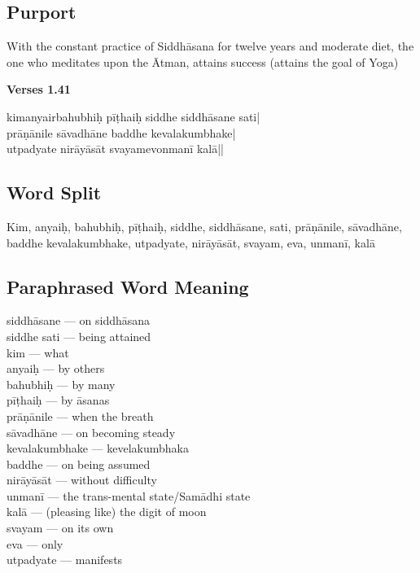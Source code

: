 \subsection*{Purport}

With the constant practice of Siddhāsana for twelve years and moderate diet, the one who meditates upon the Ātman,  attains success (attains the goal of Yoga)

\newpage
\noindent \textbf{Verses 1.41}

\begin{shloka}
kimanyairbahubhiḥ pīṭhaiḥ siddhe siddhāsane sati|\\
prāṇānile sāvadhāne baddhe kevalakumbhake|\\
utpadyate nirāyāsāt svayamevonmanī kalā||
\end{shloka}

\subsection*{Word Split}

Kim, anyaiḥ, bahubhiḥ, pīṭhaiḥ, siddhe, siddhāsane, sati, prāṇānile, sāvadhāne, baddhe kevalakumbhake, utpadyate, nirāyāsāt, svayam, eva, unmanī,  kalā 

\subsection*{Paraphrased Word Meaning}

\begin{multicols}{2}
\itemsep=0pt
siddhāsane ---  on siddhāsana  \\
siddhe sati --- being attained   \\
kim --- what   \\
anyaiḥ --- by others   \\
bahubhiḥ --- by many  \\
pīṭhaiḥ ---  by āsanas \\
prāṇānile ---	when the breath\\
sāvadhāne ---  on becoming steady	 \\
kevalakumbhake --- kevelakumbhaka  \\
baddhe ---  on being assumed \\
nirāyāsāt --- without difficulty  \\
unmanī ---  the trans-mental state/Samādhi state \\
kalā --- (pleasing like) the digit of moon  \\
svayam --- on its own \\
eva --- only  \\
utpadyate --- manifests
\end{multicols}


